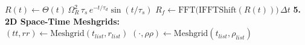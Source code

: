 \begin{algorithm}[H]
{    $R(t) \gets \Theta(t)\,\Omega_R^2\,\tau_s\, e^{-t/\tau_d}\sin(t/\tau_s)$ 
    $R_f \gets \text{FFT}\big(\text{IFFTShift}(R(t))\big)\,\Delta t$ 
    \BlankLine
    \textbf{5. 2D Space-Time Meshgrids:} \\
    $(tt, rr) \gets \text{Meshgrid}(t_{list}, r_{list})$ 
    $(\cdot, \rho\rho) \gets \text{Meshgrid}(t_{list}, \rho_{list})$ 
}
\caption{Grid and operator construction (Part 1/2): temporal/radial grids, dispersion, nonlinear operators (\texttt{build\_grids}).}
\label{alg:build_grids_1}
\end{algorithm}

\newpage

